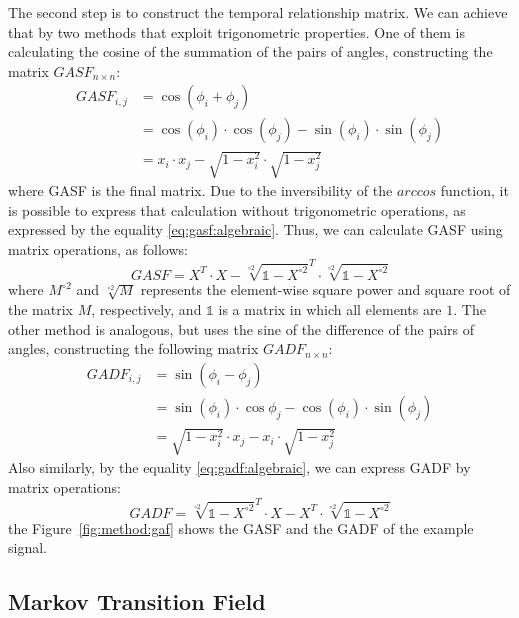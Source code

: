 

The second step is to construct the temporal relationship matrix. We can achieve that by two methods that exploit trigonometric properties. One of them is calculating the cosine of the summation of the pairs of angles, constructing the matrix $GASF_{n \times n}$:
\begin{align}
    GASF_{i,j}     & = \cos(\phi_i + \phi_j) \\
            & = \cos(\phi_i) \cdot \cos(\phi_j) - \sin(\phi_i) \cdot \sin(\phi_j) \\
            & = x_i \cdot x_j - \sqrt{1 - x_i^2} \cdot \sqrt{1 - x_j^2} \label{eq:gasf:algebraic}
\end{align}
\noindent where \gls{GASF} is the final matrix. Due to the inversibility of the $arccos$ function, it is possible to express that calculation without trigonometric operations, as expressed by the equality \ref{eq:gasf:algebraic}. Thus, we can calculate \gls{GASF} using matrix operations, as follows:  
\begin{equation}
    GASF = X^T \cdot X - \sqrt[\circ 2]{\mathds{1}-X^{\circ 2}}^T \cdot \sqrt[\circ 2]{\mathds{1}-X^{\circ 2}}
\end{equation}
\noindent where $M^{\circ 2}$ and $\sqrt[\circ 2]{M}$ represents the element-wise square power and square root of the matrix $M$, respectively, and $\mathds{1}$ is a matrix in which all elements are $1$. The other method is analogous, but uses the sine of the difference of the pairs of angles, constructing the following matrix $GADF_{n \times n}$:
\begin{align}
    GADF_{i,j} & = \sin(\phi_i - \phi_j) \\
        & = \sin(\phi_i) \cdot \cos{\phi_j} - \cos(\phi_i) \cdot \sin(\phi_j) \\
        & = \sqrt{1 - x_i^2} \cdot x_j - x_i \cdot \sqrt{1 - x_j^2}  \label{eq:gadf:algebraic}
\end{align}
\noindent Also similarly, by the equality \ref{eq:gadf:algebraic}, we can express \gls{GADF} by matrix operations:
\begin{equation}
    GADF = \sqrt[\circ 2]{\mathds{1} - X^{\circ 2}}^T \cdot X - X^T \cdot \sqrt[\circ 2]{\mathds{1} - X^{\circ 2}}
\end{equation}
\noindent the Figure~\ref{fig:method:gaf} shows the \gls{GASF} and the \gls{GADF} of the example signal.



\subsection{Markov Transition Field}

